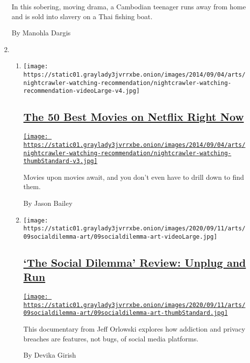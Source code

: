 \begin{enumerate}
  In this sobering, moving drama, a Cambodian teenager runs away from
  home and is sold into slavery on a Thai fishing boat.

  By Manohla Dargis
\item
  \begin{enumerate}
  \def\labelenumii{\arabic{enumii}.}
  \item
    \texttt{[image: https://static01.graylady3jvrrxbe.onion/images/2014/09/04/arts/nightcrawler-watching-recommendation/nightcrawler-watching-recommendation-videoLarge-v4.jpg]}

    \hypertarget{the-50-best-movies-on-netflix-right-now}{%
    \subsection{\texorpdfstring{\href{/article/best-movies-netflix.html}{The
    50 Best Movies on Netflix Right
    Now}}{The 50 Best Movies on Netflix Right Now}}\label{the-50-best-movies-on-netflix-right-now}}

    \href{/article/best-movies-netflix.html}{\texttt{[image: https://static01.graylady3jvrrxbe.onion/images/2014/09/04/arts/nightcrawler-watching-recommendation/nightcrawler-watching-thumbStandard-v3.jpg]}}

    Movies upon movies await, and you don't even have to drill down to
    find them.

    By Jason Bailey
  \item
    \texttt{[image: https://static01.graylady3jvrrxbe.onion/images/2020/09/11/arts/09socialdilemma-art/09socialdilemma-art-videoLarge.jpg]}

    \hypertarget{the-social-dilemma-review-unplug-and-run}{%
    \subsection{\texorpdfstring{\href{/2020/09/09/movies/the-social-dilemma-review.html}{`The
    Social Dilemma' Review: Unplug and
    Run}}{`The Social Dilemma' Review: Unplug and Run}}\label{the-social-dilemma-review-unplug-and-run}}

    \href{/2020/09/09/movies/the-social-dilemma-review.html}{\texttt{[image: https://static01.graylady3jvrrxbe.onion/images/2020/09/11/arts/09socialdilemma-art/09socialdilemma-art-thumbStandard.jpg]}}

    This documentary from Jeff Orlowski explores how addiction and
    privacy breaches are features, not bugs, of social media platforms.

    By Devika Girish
  \end{enumerate}
\end{enumerate}

